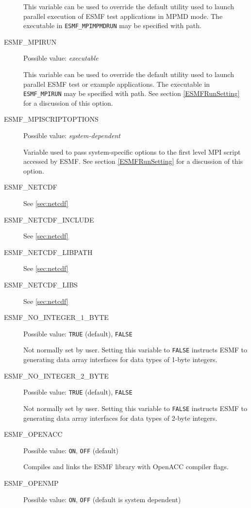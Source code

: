 \begin{description}
This variable can be used to override the default utility used to launch
parallel execution of ESMF test applications in MPMD mode. The executable in
{\tt ESMF\_MPIMPMDRUN} may be specified with path.

\item[ESMF\_MPIRUN]
Possible value: {\em executable}

This variable can be used to override the default utility used to launch
parallel ESMF test or example applications. The executable in {\tt ESMF\_MPIRUN}
may be specified with path. 
See section \ref{ESMFRunSetting} for a discussion of this option.

\item[ESMF\_MPISCRIPTOPTIONS]
Possible value: {\em system-dependent}

Variable used to pass system-specific options to the first level MPI script
accessed by ESMF.
See section \ref{ESMFRunSetting} for a discussion of this option.

\item[ESMF\_NETCDF]
See \ref{sec:netcdf}

\item[ESMF\_NETCDF\_INCLUDE]
See \ref{sec:netcdf}

\item[ESMF\_NETCDF\_LIBPATH]
See \ref{sec:netcdf}

\item[ESMF\_NETCDF\_LIBS]
See \ref{sec:netcdf}

\item[ESMF\_NO\_INTEGER\_1\_BYTE]
Possible value: {\tt TRUE} (default), {\tt FALSE}

Not normally set by user. Setting this variable to {\tt FALSE} instructs
ESMF to generating data array interfaces for data types of 1-byte integers.

\item[ESMF\_NO\_INTEGER\_2\_BYTE] 
Possible value: {\tt TRUE} (default), {\tt FALSE}

Not normally set by user. Setting this variable to {\tt FALSE} instructs
ESMF to generating data array interfaces for data types of 2-byte integers.

\item[ESMF\_OPENACC] 
Possible value: {\tt ON}, {\tt OFF} (default)

Compiles and links the ESMF library with OpenACC compiler flags.

\item[ESMF\_OPENMP] 
Possible value: {\tt ON}, {\tt OFF} (default is system dependent)


\end{description}
